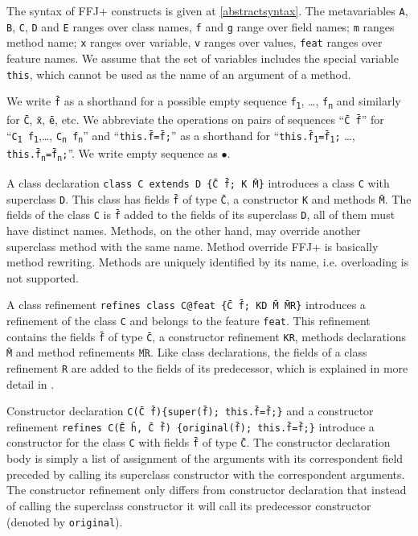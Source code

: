 The syntax of \gls{FFJ+} constructs is given at \cref{abstractsyntax}. The metavariables
\texttt{A}, \texttt{B}, \texttt{C}, \texttt{D} and \texttt{E} ranges over class names, \texttt{f} and \texttt{g} range over
field names; \texttt{m} ranges method name; \texttt{x} ranges over variable, \texttt{v} ranges over
values, \texttt{feat} ranges over feature names. We assume that the set of variables includes the special variable \texttt{this}, which
cannot be used as the name of an argument of a method.

We write \texttt{\=f} as a shorthand for a possible empty sequence \texttt{f\textsubscript1}, \dots, \texttt{f\textsubscript{n}} 
and similarly for \texttt{\=C}, \texttt{\=x}, \texttt{\=e}, etc. We abbreviate the operations on pairs of sequences
``\texttt{\=C~\=f}'' for ``\texttt{C\textsubscript1~f\textsubscript1},\dots, \texttt{C\textsubscript{n}~f\textsubscript{n}}''
and ``\texttt{this.\=f=\=f;}'' as a shorthand for 
``\texttt{this.\=f\textsubscript1=\=f\textsubscript1;} \dots, \texttt{this.\=f\textsubscript{n}=\=f\textsubscript{n};}''.
We write empty sequence as $\bullet$.


A class declaration \texttt{class\ C~extends~D\ \{\={C} \={f}; K \={M}\}} 
introduces a class \texttt{C} with superclass \texttt{D}. This class has fields \texttt{\=f}
of type \texttt{\=C}, a constructor \texttt{K} and methods \texttt{\=M}. The fields of the class \texttt{C}
is \texttt{\=f} added to the fields of its superclass \texttt{D}, all of them must have distinct names.
Methods, on the other hand, may override another superclass method with the same name.
Method override \gls{FFJ+} is basically method rewriting. 
Methods are uniquely identified by its name, i.e. overloading is not supported.

A class refinement \texttt{refines~class~C@feat~\{\={C}~\={f};~KD~\={M}~\={MR}\}}
introduces a refinement of the class \texttt{C} and belongs to the feature \texttt{feat}. 
This refinement contains the fields  \texttt{\=f} of type \texttt{\=C}, 
a constructor refinement \texttt{KR}, methods declarations \texttt{\=M} and method refinements $\overline{\texttt{MR}}$.
Like class declarations, the fields of a class refinement \texttt{R} are added to the fields of its predecessor, which
is explained in more detail in .

Constructor declaration \texttt{C(\={C}~\={f})\{super(\={f}); this.\={f}=\={f};\}} and a constructor refinement 
\texttt{refines~C(\={E}~\={h}, \={C}~\={f}) \{original(\={f}); this.\={f}=\={f};\}} introduce a constructor 
for the class \texttt{C} with fields \texttt{\=f} of type \texttt{\=C}. The constructor declaration body is simply 
a list of assignment of the arguments with its correspondent field preceded by calling its superclass constructor with the correspondent arguments.
The constructor refinement only differs from constructor declaration that instead of calling the superclass constructor
it will call its predecessor constructor (denoted by \texttt{original}).

